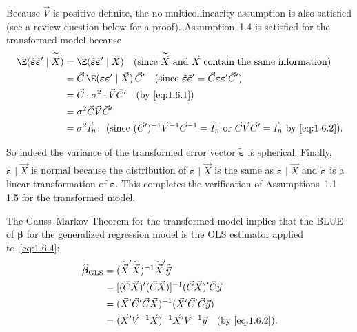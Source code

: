 Because $\vec{V}$ is positive definite, the no-multicollinearity assumption is also
satisfied (see a review question below for a proof).  Assumption~1.4 is satisfied for
the transformed model because
%
\begin{align*}
  \E(\tilde{\bm{\varepsilon}}\tilde{\bm{\varepsilon}}' \mid \widetilde{\vec{X}})
    &= \E(\tilde{\bm{\varepsilon}}\tilde{\bm{\varepsilon}}' \mid \vec{X})
      \quad \text{(since $\widetilde{\vec{X}}$ and $\vec{X}$ contain the same
        information)} \\
    &= \vec{C}\,\E(\bm{\varepsilon}\bm{\varepsilon}' \mid \vec{X})\,\vec{C}'
      \quad \text{(since
        $\tilde{\bm{\varepsilon}}\tilde{\bm{\varepsilon}}'
          = \vec{C}\bm{\varepsilon}\bm{\varepsilon}'\vec{C}'$)} \\
    &= \vec{C} \cdot \sigma^2 \cdot \vec{V}\vec{C}'
      \quad \text{(by~\eqref{eq:1.6.1})} \\
    &= \sigma^2 \vec{C}\vec{V}\vec{C}' \\
    &= \sigma^2 \vec{I}_n
      \quad \text{(since $(\vec{C}')^{-1}\vec{V}^{-1}\vec{C}^{-1} = \vec{I}_n$
        or $\vec{C}\vec{V}\vec{C}' = \vec{I}_n$ by~\eqref{eq:1.6.2}).}
\end{align*}

So indeed the variance of the transformed error vector $\tilde{\bm{\varepsilon}}$ is
spherical.  Finally, $\tilde{\bm{\varepsilon}} \mid \widetilde{\vec{X}}$ is normal
because the distribution of $\tilde{\bm{\varepsilon}} \mid \widetilde{\vec{X}}$ is
the same as $\tilde{\bm{\varepsilon}} \mid \vec{X}$ and $\tilde{\bm{\varepsilon}}$
is a linear transformation of $\bm{\varepsilon}$.  This completes the verification of
Assumptions~1.1--1.5 for the transformed model.

The Gauss--Markov Theorem for the transformed model implies that the BLUE of
$\bm{\beta}$ for the generalized regression model is the OLS estimator applied
to~\eqref{eq:1.6.4}:
%
\begin{align}
  \widehat{\bm{\beta}}_{\text{GLS}}
    &= (\widetilde{\vec{X}}'\widetilde{\vec{X}})^{-1}
       \widetilde{\vec{X}}'\tilde{\vec{y}} \notag \\
    &= [(\vec{C}\vec{X})'(\vec{C}\vec{X})]^{-1}(\vec{C}\vec{X})'\vec{C}\vec{y}
       \notag \\
    &= (\vec{X}'\vec{C}'\vec{C}\vec{X})^{-1}(\vec{X}'\vec{C}'\vec{C}\vec{y})
       \notag \\
    &= (\vec{X}'\vec{V}^{-1}\vec{X})^{-1}\vec{X}'\vec{V}^{-1}\vec{y}
       \quad \text{(by~\eqref{eq:1.6.2}).}
  \label{eq:1.6.5}
\end{align}

